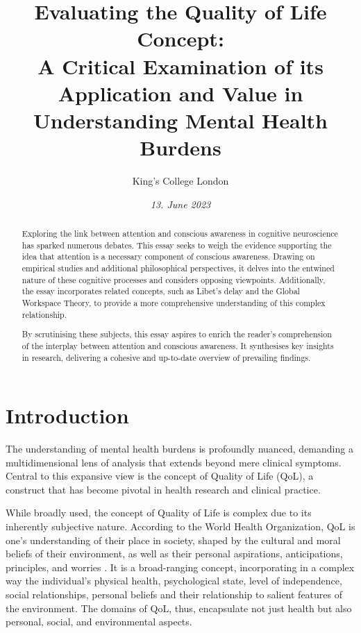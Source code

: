\documentclass[10pt]{article}
\title{\textbf{Evaluating the Quality of Life Concept:} \\ A Critical Examination of its Application and Value in Understanding Mental Health Burdens}
\author[ ]{King’s College London}
\date{\textit{13. June 2023}}
\begin{document}

\maketitle
\thispagestyle{empty}

\begin{sloppypar} %
  \begin{abstract}
    Exploring the link between attention and conscious awareness in cognitive neuroscience has sparked numerous debates. This essay seeks to weigh the evidence supporting the idea that attention is a necessary component of conscious awareness. Drawing on empirical studies and additional philosophical perspectives, it delves into the entwined nature of these cognitive processes and considers opposing viewpoints. Additionally, the essay incorporates related concepts, such as Libet’s delay and the Global Workspace Theory, to provide a more comprehensive understanding of this complex relationship.

    By scrutinising these subjects, this essay aspires to enrich the reader’s comprehension of the interplay between attention and conscious awareness. It synthesises key insights in research, delivering a cohesive and up-to-date overview of prevailing findings.
  \end{abstract}
  \pagebreak

  \tableofcontents
  \pagebreak

  \listoffigures
  \pagebreak

  \listoftables
  \pagebreak


  \doublespacing

  \section{Introduction}
  \label{sec:introduction}

  The understanding of mental health burdens is profoundly nuanced, demanding a multidimensional lens of analysis that extends beyond mere clinical symptoms. Central to this expansive view is the concept of Quality of Life (QoL), a construct that has become pivotal in health research and clinical practice.

  While broadly used, the concept of Quality of Life is complex due to its inherently subjective nature. According to the World Health Organization, QoL is one's understanding of their place in society, shaped by the cultural and moral beliefs of their environment, as well as their personal aspirations, anticipations, principles, and worries \citep{harper_development_1998}. It is a broad-ranging concept, incorporating in a complex way the individual's physical health, psychological state, level of independence, social relationships, personal beliefs and their relationship to salient features of the environment. The domains of QoL, thus, encapsulate not just health but also personal, social, and environmental aspects.


\end{sloppypar}
\end{document}
